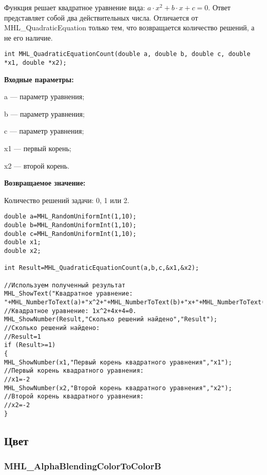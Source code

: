 \documentclass[a4paper,12pt]{article}
\begin{document}
Функция решает квадратное уравнение вида: $a\cdot x^2+b\cdot x+c=0$. Ответ представляет собой два действительных числа. Отличается от MHL\_QuadraticEquation только тем, что возвращается количество решений, а не его наличие.


\begin{lstlisting}[label=code_syntax_MHL_QuadraticEquationCount,caption=Синтаксис]
int MHL_QuadraticEquationCount(double a, double b, double c, double *x1, double *x2);
\end{lstlisting}

\textbf{Входные параметры:}
 
a --- параметр уравнения;
 
b --- параметр уравнения;
 
c --- параметр уравнения;
 
x1 --- первый корень;
 
x2 --- второй корень.

\textbf{Возвращаемое значение:}
 
Количество решений задачи: 0, 1 или  2.



\begin{lstlisting}[label=code_use_MHL_QuadraticEquationCount,caption=Пример использования]
double a=MHL_RandomUniformInt(1,10);
double b=MHL_RandomUniformInt(1,10);
double c=MHL_RandomUniformInt(1,10);
double x1;
double x2;

int Result=MHL_QuadraticEquationCount(a,b,c,&x1,&x2);

//Используем полученный результат
MHL_ShowText("Квадратное уравнение: "+MHL_NumberToText(a)+"x^2+"+MHL_NumberToText(b)+"x+"+MHL_NumberToText(c)+"=0");
//Квадратное уравнение: 1x^2+4x+4=0.
MHL_ShowNumber(Result,"Сколько решений найдено","Result");
//Сколько решений найдено:
//Result=1
if (Result>=1)
{
MHL_ShowNumber(x1,"Первый корень квадратного уравнения","x1");
//Первый корень квадратного уравнения:
//x1=-2
MHL_ShowNumber(x2,"Второй корень квадратного уравнения","x2");
//Второй корень квадратного уравнения:
//x2=-2
}
\end{lstlisting}

\subsection{Цвет}

\subsubsection{MHL\_AlphaBlendingColorToColorB}\label{MHL_AlphaBlendingColorToColorB}
\end{document}
